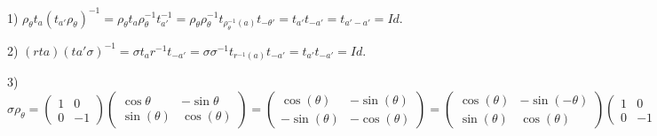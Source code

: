 \documentclass[Algebra/algebra_notes.tex]{subfiles}
\begin{document}
\begin{proof*}

	1) $\rho_{\theta }t_{a}(t_{a'}\rho_{\theta })^{-1} = \rho_{\theta }t_{a}\rho_{\theta }^{-1}t_{a'}^{-1} = \rho_{\theta }\rho_{\theta }^{-1}t_{\rho_{\theta }^{-1}(a)}t_{-\theta '}
		= t_{a'}t_{-a'} = t_{a'-a'} = Id.$

	2) $(rta)(ta'\sigma )^{-1} = \sigma t_{a}r^{-1}t_{-a'} = \sigma \sigma^{-1}t_{r^{-1}(a)}t_{-a'} = t_{a'}t_{-a'} = Id.$

	3) $\sigma \rho_{\theta } = \begin{pmatrix}
			1 & 0  \\
			0 & -1
		\end{pmatrix}\begin{pmatrix}
			\cos{\theta }   & -\sin{\theta }  \\
			\sin{(\theta )} & \cos{(\theta )}
		\end{pmatrix} = \begin{pmatrix}
			\cos{(\theta )}  & -\sin{(\theta )} \\
			-\sin{(\theta )} & -\cos{(\theta )}
		\end{pmatrix} = \begin{pmatrix}
			\cos{(\theta )} & -\sin{(-\theta )} \\
			\sin{(\theta )} & \cos{(\theta )}
		\end{pmatrix}\begin{pmatrix}
			1 & 0  \\
			0 & -1
		\end{pmatrix} = \rho_{-\theta }\sigma.$ \qedsymbol
\end{proof*}
\newpage
\end{document}
